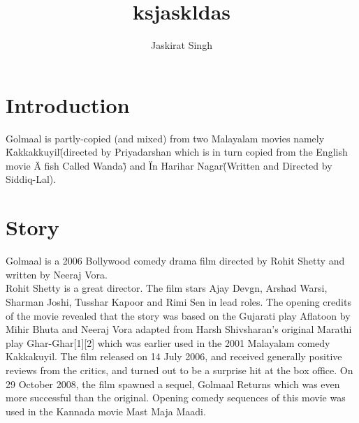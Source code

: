 \documentclass[a4paper,10pt]{article}
\title{ksjaskldas}
\author{Jaskirat Singh}
\begin{document}
\maketitle

\section{Introduction}
Golmaal is partly-copied (and mixed) from two Malayalam movies namely \"Kakkakkuyil\" (directed by Priyadarshan which is in turn copied from the English movie \"A fish Called Wanda\") and \"In Harihar Nagar\" (Written and Directed by Siddiq-Lal).
\section{Story}
Golmaal is a 2006 Bollywood comedy drama film directed by Rohit Shetty and written by Neeraj Vora.\\
Rohit Shetty is a great director.
The film stars Ajay Devgn, Arshad Warsi, Sharman Joshi, Tusshar Kapoor and Rimi Sen in lead roles. 
The opening credits of the movie revealed that the story was based on the Gujarati play Aflatoon by Mihir Bhuta and Neeraj Vora adapted from Harsh Shivsharan's original Marathi play Ghar-Ghar[1][2] which was earlier used in the 2001 Malayalam comedy Kakkakuyil. The film released on 14 July 2006, and received generally positive reviews from the critics, and turned out to be a surprise hit at the box office. On 29 October 2008, the film spawned a sequel, Golmaal Returns which was even more successful than the original. Opening comedy sequences of this movie was used in the Kannada movie Mast Maja Maadi.
\end{document}

